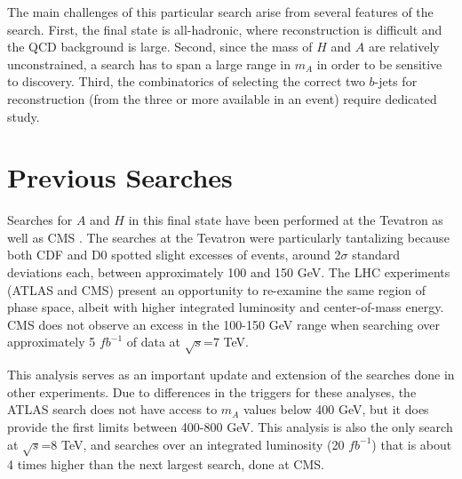 The main challenges of this particular search arise from several features of the search.  
First, the final state is all-hadronic, where reconstruction is difficult and 
the QCD background is large.  Second, since the mass of $H$ 
and $A$ are relatively unconstrained, a search has to span a large 
range in $m_A$ in order to be sensitive to discovery.  
Third, the combinatorics of selecting the correct two $b$-jets for reconstruction 
(from the three or more available in an event) require dedicated study.  


\section{Previous Searches}
Searches for $A$ and $H$ in this final state have been performed at the Tevatron
as well as CMS \cite{D0bH} \cite{CDFbH} \cite{CMSbH}.  The searches at the 
Tevatron were particularly tantalizing because both CDF and D0 spotted 
slight excesses of events, around 2$\sigma$ standard deviations each, between approximately
100 and 150 GeV.  The LHC experiments (ATLAS and CMS) present an opportunity to
re-examine the same region of phase space, albeit with higher integrated luminosity
and center-of-mass energy.  CMS does not observe an excess in the 100-150 GeV range 
when searching over approximately 5 $fb^{-1}$ of data at $\sqrt{s}$=7 TeV.

This analysis serves as an important update and extension of the searches done
in other experiments.  Due to differences in the triggers for these analyses,
the ATLAS search does not have access to $m_A$ values below 400 GeV, but it does 
provide the first limits between 400-800 GeV.  This analysis is also the only
search at $\sqrt{s}$=8 TeV, and searches over an integrated luminosity (20 $fb^{-1}$)
that is about 4 times higher than the next largest search, done at CMS.


 






